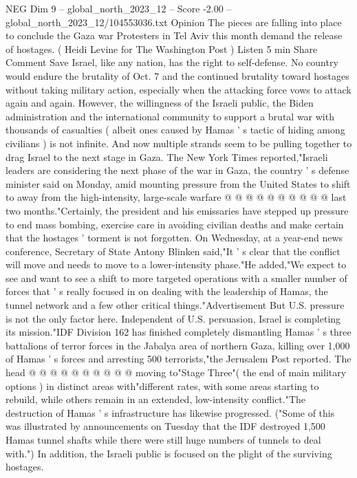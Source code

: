 \begin{textsample}{NEG Dim 9 – global\_north\_2023\_12 – Score -2.00 – global\_north\_2023\_12/104553036.txt}  \label{ex:f9_neg_291}
Opinion The pieces are falling into place to conclude the Gaza war Protesters in Tel Aviv this month demand the release of hostages. ( Heidi Levine for The Washington Post ) Listen 5 min Share Comment Save Israel, like any nation, has the right to self-defense.
No country would endure the brutality of Oct. 7 and the continued brutality toward hostages without taking military action, especially when the attacking force vows to attack again and again.
However, the willingness of the Israeli public, the Biden administration and the international community to support a brutal war with thousands of casualties ( albeit ones caused by Hamas ' s tactic of hiding among civilians ) is not infinite.
And now multiple strands seem to be pulling together to drag Israel to the next stage in Gaza.
The New York Times reported,"Israeli leaders are considering the next phase of the war in Gaza, the country ' s defense minister said on Monday, amid mounting pressure from the United States to shift to away from the high-intensity, large-scale warfare @ @ @ @ @ @ @ @ @ @ last two months."Certainly, the president and his emissaries have stepped up pressure to end mass bombing, exercise care in avoiding civilian deaths and make certain that the hostages ' torment is not forgotten.
On Wednesday, at a year-end news conference, Secretary of State Antony Blinken said,"It ' s clear that the conflict will move and needs to move to a lower-intensity phase."He added,"We expect to see and want to see a shift to more targeted operations with a smaller number of forces that ' s really focused in on dealing with the leadership of Hamas, the tunnel network and a few other critical things."Advertisement But U.S. pressure is not the only factor here.
Independent of U.S. persuasion, Israel is completing its mission."IDF Division 162 has finished completely dismantling Hamas ' s three battalions of terror forces in the Jabalya area of northern Gaza, killing over 1,000 of Hamas ' s forces and arresting 500 terrorists,"the Jerusalem Post reported.
The head @ @ @ @ @ @ @ @ @ @ moving to"Stage Three"( the end of main military options ) in distinct areas with"different rates, with some areas starting to rebuild, while others remain in an extended, low-intensity conflict."The destruction of Hamas ' s infrastructure has likewise progressed. ("Some of this was illustrated by announcements on Tuesday that the IDF destroyed 1,500 Hamas tunnel shafts while there were still huge numbers of tunnels to deal with.") In addition, the Israeli public is focused on the plight of the surviving hostages.

\end{textsample}
